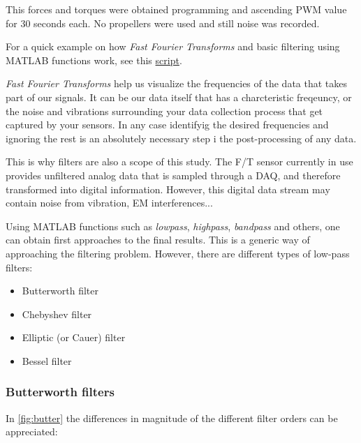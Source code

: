 \documentclass[a4paper]{article}
\begin{document}
This forces and torques were obtained programming and ascending PWM value for 30 seconds each. No propellers were used and still noise was recorded. 

For a quick example on how \textit{Fast Fourier Transforms} and basic filtering using MATLAB functions work, see this \hyperref{https://github.com/IrisDuMutel/ATIMini40_software/blob/master/MATLAB/Scripts/Examples/example_FFTandFilters.m}{category}{name}{script}.

\textit{Fast Fourier Transforms} help us visualize the frequencies of the data that takes part of our signals. It can be our data itself that has a charcteristic freqeuncy, or the noise and vibrations surrounding your data collection process that get captured by your sensors. In any case identifyig the desired frequencies and ignoring the rest is an absolutely necessary step i the post-processing of any data.

This is why filters are also a scope of this study. The F/T sensor currently in use provides unfiltered analog data that is sampled through a DAQ, and therefore transformed into digital information. However, this digital data stream may contain noise from vibration, EM interferences...

Using MATLAB functions such as \textit{lowpass}, \textit{highpass}, \textit{bandpass} and others, one can obtain first approaches to the final results. 
This is a generic way of approaching the filtering problem. However, there are different types of low-pass filters:

\begin{itemize}
	\item Butterworth filter
	\item Chebyshev filter
	\item Elliptic (or Cauer) filter
	\item Bessel filter
\end{itemize}

\subsubsection{Butterworth filters}

In \autoref{fig:butter} the differences in magnitude of the different filter orders can be appreciated:
\end{document}

